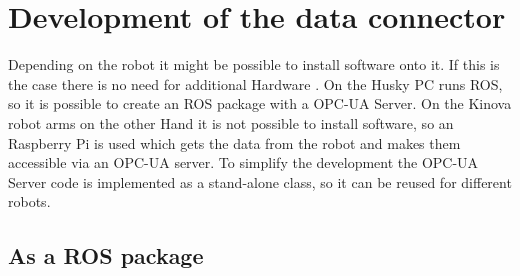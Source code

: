 \documentclass[conference]{IEEEtran}
\begin{document}
\section{Development of the data connector}
Depending on the robot it might be possible to install software onto it.
If this is the case there is no need for additional Hardware .
On the Husky PC runs ROS, so it is possible to create an ROS package with a OPC-UA Server.
On the Kinova robot arms on the other Hand it is not possible to install software, so an Raspberry Pi is used which gets the data from the robot and makes them accessible via an OPC-UA server.
To simplify the development the OPC-UA Server code is implemented as a stand-alone class, so it can be reused for different robots.
\subsection{As a ROS package}
\end{document}
